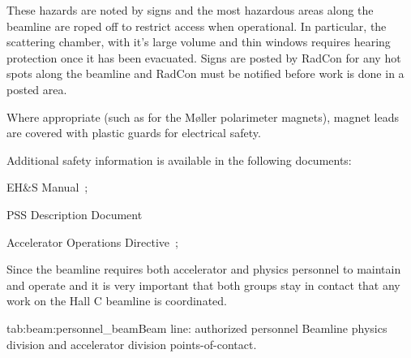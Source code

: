 \begin{safetyen}{0}{0}
These hazards are noted by signs and the most hazardous areas along
the beamline are roped off to restrict access when operational.  In
particular, the scattering chamber, with it's large volume and thin
windows requires hearing protection once it has been evacuated.  Signs
are posted by RadCon for any hot spots along the beamline and RadCon
must be notified before work is done in a posted area.

Where appropriate (such as for the M\o ller polarimeter magnets),
magnet leads are covered with plastic guards for electrical safety.

\noindent{}Additional safety information is available in the following documents:
\begin{list}{--}{\setlength{\itemsep}{-0.15cm}}
  \item EH\&S Manual~\cite{EHScebaf}; \item PSS Description
  Document~\cite{PSScebaf} \item Accelerator Operations
  Directive~\cite{AODcebaf};
\end{list}


Since the beamline requires both accelerator and physics personnel to
maintain and operate and it is very important that both groups stay in
contact that any work on the Hall C beamline is coordinated.

\begin{namestab}{tab:beam:personnel_beam}{Beam line: authorized personnel}{%
   Beamline physics division and accelerator division points-of-contact.}
\end{namestab}
\end{safetyen}

